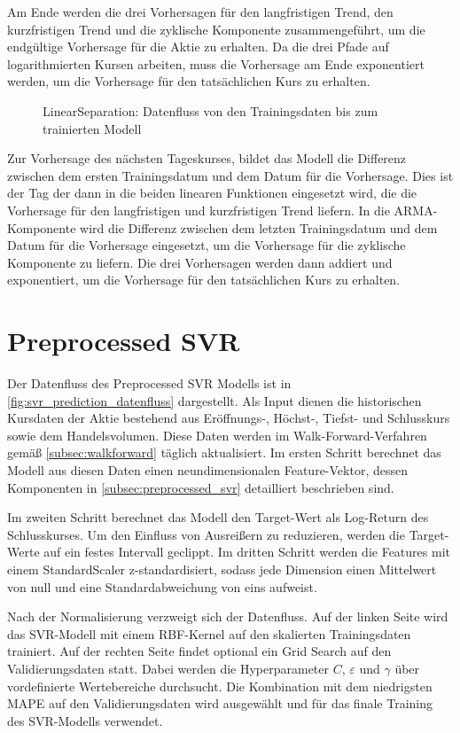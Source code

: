 Am Ende werden die drei Vorhersagen für den langfristigen Trend, den kurzfristigen Trend und die zyklische Komponente zusammengeführt, um die endgültige Vorhersage für die Aktie zu erhalten. Da die drei Pfade auf logarithmierten Kursen arbeiten, muss die Vorhersage am Ende exponentiert werden, um die Vorhersage für den tatsächlichen Kurs zu erhalten.
\begin{figure}[htbp]
    \centering
    
    \caption{LinearSeparation: Datenfluss von den Trainingsdaten bis zum trainierten Modell}
    \label{fig:linear_separation_datenfluss}
\end{figure}
Zur Vorhersage des nächsten Tageskurses, bildet das Modell die Differenz zwischen dem ersten Trainingsdatum und dem Datum für die Vorhersage. Dies ist der Tag der dann in die beiden linearen Funktionen eingesetzt wird, die die Vorhersage für den langfristigen und kurzfristigen Trend liefern. In die ARMA-Komponente wird die Differenz zwischen dem letzten Trainingsdatum und dem Datum für die Vorhersage eingesetzt, um die Vorhersage für die zyklische Komponente zu liefern. Die drei Vorhersagen werden dann addiert und exponentiert, um die Vorhersage für den tatsächlichen Kurs zu erhalten.
\section{Preprocessed SVR}\label{sec:preprocessed_svr}
Der Datenfluss des Preprocessed SVR Modells ist in \cref{fig:svr_prediction_datenfluss} dargestellt. Als Input dienen die historischen Kursdaten der Aktie bestehend aus Eröffnungs-, Höchst-, Tiefst- und Schlusskurs sowie dem Handelsvolumen. Diese Daten werden im Walk-Forward-Verfahren gemäß \cref{subsec:walkforward} täglich aktualisiert. Im ersten Schritt berechnet das Modell aus diesen Daten einen neundimensionalen Feature-Vektor, dessen Komponenten in \cref{subsec:preprocessed_svr} detailliert beschrieben sind.

Im zweiten Schritt berechnet das Modell den Target-Wert als Log-Return des Schlusskurses. Um den Einfluss von Ausreißern zu reduzieren, werden die Target-Werte auf ein festes Intervall geclippt. Im dritten Schritt werden die Features mit einem StandardScaler z-standardisiert, sodass jede Dimension einen Mittelwert von null und eine Standardabweichung von eins aufweist.

Nach der Normalisierung verzweigt sich der Datenfluss. Auf der linken Seite wird das SVR-Modell mit einem RBF-Kernel auf den skalierten Trainingsdaten trainiert. Auf der rechten Seite findet optional ein Grid Search auf den Validierungsdaten statt. Dabei werden die Hyperparameter $C$, $\varepsilon$ und $\gamma$ über vordefinierte Wertebereiche durchsucht. Die Kombination mit dem niedrigsten \ac{MAPE} auf den Validierungsdaten wird ausgewählt und für das finale Training des SVR-Modells verwendet.

